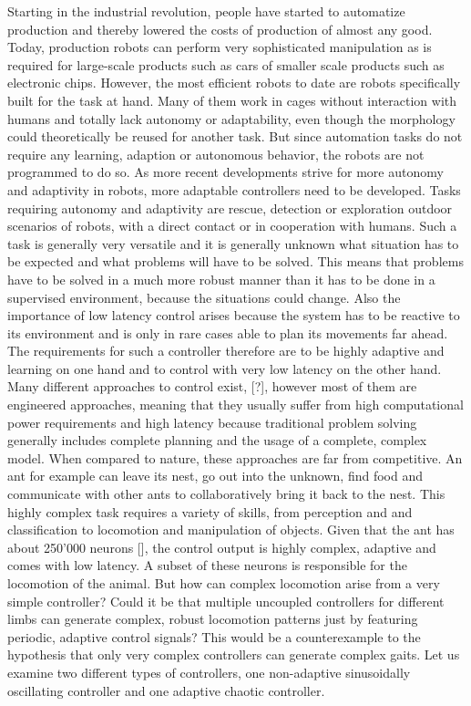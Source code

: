 \documentclass[main]{subfiles}
\begin{document}
Starting in the industrial revolution, people have started to automatize production and thereby lowered the costs of production of almost any good. Today, production robots can perform very sophisticated manipulation as is required for large-scale products such as cars of smaller scale products such as electronic chips. However, the most efficient robots to date are robots specifically built for the task at hand. Many of them work in cages without interaction with humans and totally lack autonomy or adaptability, even though the morphology could theoretically be reused for another task. But since automation tasks do not require any learning, adaption or autonomous behavior, the robots are not programmed to do so. As more recent developments strive for more autonomy and adaptivity in robots, more adaptable controllers need to be developed. Tasks requiring autonomy and adaptivity are rescue, detection or exploration outdoor scenarios of robots, with a direct contact or in cooperation with humans. Such a task is generally very versatile and it is generally unknown what situation has to be expected and what problems will have to be solved. This means that problems have to be solved in a much more robust manner than it has to be done in a supervised environment, because the situations could change. Also the importance of low latency control arises because the system has to be reactive to its environment and is only in rare cases able to plan its movements far ahead. The requirements for such a controller therefore are to be highly adaptive and learning on one hand and to control with very low latency on the other hand. Many different approaches to control exist, [?], however most of them are engineered approaches, meaning that they usually suffer from high computational power requirements and high latency because traditional problem solving generally includes complete planning and the usage of a complete, complex model. When compared to nature, these approaches are far from competitive. An ant for example can leave its nest, go out into the unknown, find food and communicate with other ants to collaboratively bring it back to the nest. This highly complex task requires a variety of skills, from perception and and classification to locomotion and manipulation of objects. Given that the ant has about 250'000 neurons [], the control output is highly complex, adaptive and comes with low latency. A subset of these neurons is responsible for the locomotion of the animal. But how can complex locomotion arise from a very simple controller? Could it be that multiple uncoupled controllers for different limbs can generate complex, robust locomotion patterns just by featuring periodic, adaptive control signals? This would be a counterexample to the hypothesis that only very complex controllers can generate complex gaits. Let us examine two different types of controllers, one non-adaptive sinusoidally oscillating controller and one adaptive chaotic controller.
\end{document}
